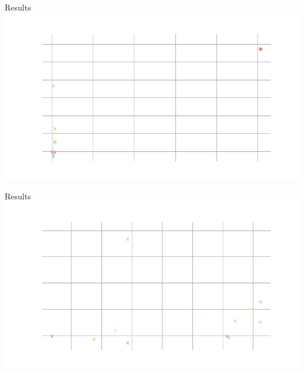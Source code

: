 \documentclass{beamer}
\begin{document}
\begin{darkframes}
    \begin{frame}{Results}
	\includegraphics[width=\textwidth]{fig/params_speed}
	\end{frame}


    \begin{frame}{Results}
\includegraphics[width=\textwidth]{fig/params_speed_close}
\end{frame}



\end{darkframes}
\end{document}
